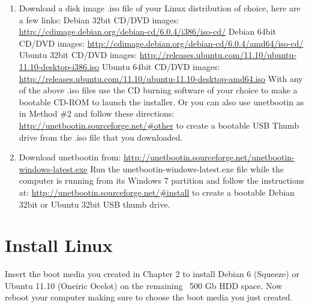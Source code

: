 \documentclass[12pt,notitlepage,onecolumn,oneside,openany,draft]{memoir}
\begin{document}
\begin{enumerate}
\item \textsf{Download a disk image .iso file of your Linux distribution of choice, here are a few links:} \newline
\textsf{Debian 32bit CD/DVD images:} \newline
\url{http://cdimage.debian.org/debian-cd/6.0.4/i386/iso-cd/}\newline
\textsf{Debian 64bit CD/DVD images:} \newline
\url{http://cdimage.debian.org/debian-cd/6.0.4/amd64/iso-cd/}\newline
\textsf{Ubuntu 32bit CD/DVD images:} \newline
\url{http://releases.ubuntu.com/11.10/ubuntu-11.10-desktop-i386.iso} \newline
\textsf{Ubuntu 64bit CD/DVD images:} \newline
\url{http://releases.ubuntu.com/11.10/ubuntu-11.10-desktop-amd64.iso} \newline
\newline
\textsf{With any of the above .iso files use the CD burning software of your choice to make a bootable CD-ROM to launch the installer. Or you can also use unetbootin as in Method \#2 and follow these directions:} \newline
\url{http://unetbootin.sourceforge.net/#other} \newline
\textsf{to create a bootable USB Thumb drive from the .iso file that you downloaded.}

\item \textsf{Download unetbootin from:} \newline
\url{http://unetbootin.sourceforge.net/unetbootin-windows-latest.exe}\newline
\textsf{Run the unetbootin-windows-latest.exe file while the computer is running from its Windows 7 partition and follow the instructions at:} \newline
\url{http://unetbootin.sourceforge.net/#install} \newline
\textsf{to create a bootable Debian 32bit or Ubuntu 32bit USB thumb drive.}
\end{enumerate}

\chapter{\textsf{Install Linux}}

\textsf{Insert the boot media you created in Chapter 2 to install Debian 6 (Squeeze) or Ubuntu 11.10 (Oneiric Ocelot) on the remaining ~500 Gb HDD space.  Now reboot your computer making sure to choose the boot media you just created.} \newline
\end{document}
